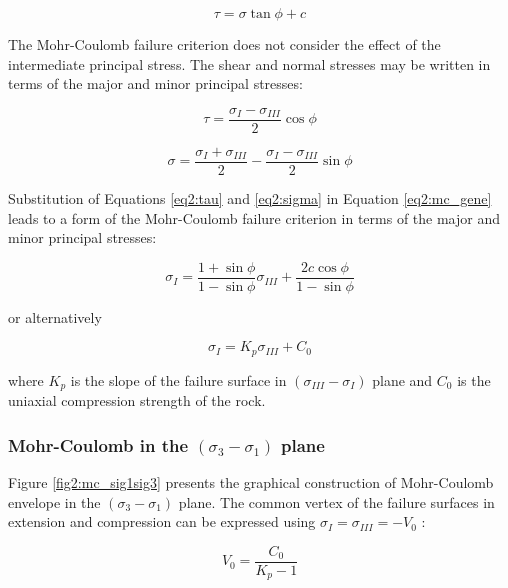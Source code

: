 \begin{equation}\label{eq2:mc_gene}
    \tau = \sigma \tan \phi + c
\end{equation}

The Mohr-Coulomb failure criterion does not consider the effect of the intermediate principal stress. The shear and normal stresses may be written in terms of the major and minor principal stresses: 

\begin{equation}\label{eq2:tau}
    \tau = \frac{\sigma_I - \sigma_{III}}{2} \cos \phi
\end{equation}

\begin{equation}\label{eq2:sigma}
    \sigma = \frac{\sigma_I + \sigma_{III}}{2} - \frac{\sigma_I - \sigma_{III}}{2} \sin \phi
\end{equation}

Substitution of Equations \ref{eq2:tau} and \ref{eq2:sigma} in Equation \ref{eq2:mc_gene} leads to a form of the Mohr-Coulomb failure criterion in terms of the major and minor principal stresses:

\begin{equation} \label{eq2:MCfinalform}
    \sigma_{I}=\frac{1+\sin \phi}{1-\sin \phi} \sigma_{I I I}+\frac{2 c \cos \phi}{1-\sin \phi}
\end{equation}

or alternatively

\begin{equation}\label{eq2:MCcondenseform}
    \sigma_I = K_p \sigma_{III} + C_0
\end{equation}

where $K_p$ is the slope of the failure surface in $(\sigma_{III} -\sigma_{I})$ plane and $C_0$ is the uniaxial compression strength of the rock. 

\subsubsection{Mohr-Coulomb in the \texorpdfstring{$(\sigma_3 -\sigma_1)$}{sigma 3 - sigma 1} plane}

Figure \ref{fig2:mc_sig1sig3} presents the graphical construction of Mohr-Coulomb envelope in the $(\sigma_3 -\sigma_1)$ plane. The common vertex of the failure surfaces in extension and compression can be expressed using $\sigma_I = \sigma_{III} = -V_0$ :

\begin{equation}\label{eq2:MC_Vo}
    V_0 = \frac{C_0}{K_p-1}
\end{equation}



